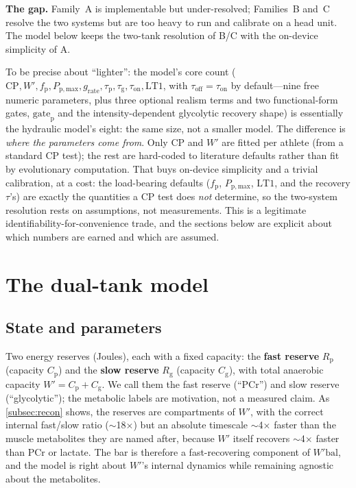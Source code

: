 \documentclass[11pt,a4paper]{article}
\newcommand{\Wp}{\ensuremath{W'}}
\newcommand{\Wbal}{\ensuremath{W'\!\text{bal}}}
\newcommand{\CP}{\ensuremath{\mathrm{CP}}}
\newcommand{\LTone}{\ensuremath{\mathrm{LT1}}}
\newcommand{\fp}{\ensuremath{f_{\mathrm p}}}
\newcommand{\Rp}{\ensuremath{R_{\mathrm p}}}
\newcommand{\Rg}{\ensuremath{R_{\mathrm g}}}
\newcommand{\Cp}{\ensuremath{C_{\mathrm p}}}
\newcommand{\Cg}{\ensuremath{C_{\mathrm g}}}
\newcommand{\Ppmax}{\ensuremath{P_{\mathrm{p,max}}}}
\newcommand{\grate}{\ensuremath{g_{\mathrm{rate}}}}
\newcommand{\taup}{\ensuremath{\tau_{\mathrm p}}}
\newcommand{\taug}{\ensuremath{\tau_{\mathrm g}}}
\newcommand{\tauon}{\ensuremath{\tau_{\mathrm{on}}}}
\newcommand{\tauoff}{\ensuremath{\tau_{\mathrm{off}}}}
\newcommand{\gatep}{\ensuremath{\mathrm{gate}_{\mathrm p}}}
\begin{document}
\textbf{The gap.} Family~A is implementable but under-resolved; Families~B and~C resolve the two systems
but are too heavy to run and calibrate on a head unit. The model below keeps the two-tank resolution of
B/C with the on-device simplicity of A.

To be precise about ``lighter'': the model's core count
($\CP, \Wp, \fp, \Ppmax, \grate, \taup, \taug, \tauon, \LTone$, with $\tauoff = \tauon$ by default---nine
free numeric parameters, plus three optional realism terms and two functional-form gates,
$\gatep$ and the intensity-dependent glycolytic recovery shape) is essentially the hydraulic model's
eight: the same size, not a smaller model. The difference is \emph{where the parameters come from}. Only
\CP{} and \Wp{} are fitted per athlete (from a standard \CP{} test); the rest are hard-coded to literature
defaults rather than fit by evolutionary computation. That buys on-device simplicity and a trivial
calibration, at a cost: the load-bearing defaults ($\fp$, $\Ppmax$, $\LTone$, and the recovery $\tau$'s)
are exactly the quantities a \CP{} test does \emph{not} determine, so the two-system resolution rests on
assumptions, not measurements. This is a legitimate identifiability-for-convenience trade, and the
sections below are explicit about which numbers are earned and which are assumed.

\section{The dual-tank model}\label{sec:model}

\subsection{State and parameters}\label{subsec:state}

Two energy reserves (Joules), each with a fixed capacity: the \textbf{fast reserve} \Rp{} (capacity \Cp)
and the \textbf{slow reserve} \Rg{} (capacity \Cg), with total anaerobic capacity $\Wp = \Cp + \Cg$. We
call them the fast reserve (``PCr'') and slow reserve (``glycolytic''); the metabolic labels are
motivation, not a measured claim. As \cref{subsec:recon} shows, the reserves are compartments of \Wp, with
the correct internal fast/slow ratio ($\sim$18$\times$) but an absolute timescale $\sim$4$\times$ faster
than the muscle metabolites they are named after, because \Wp{} itself recovers $\sim$4$\times$ faster
than PCr or lactate. The bar is therefore a fast-recovering component of \Wbal, and the model is right
about \Wp's internal dynamics while remaining agnostic about the metabolites.
\end{document}
